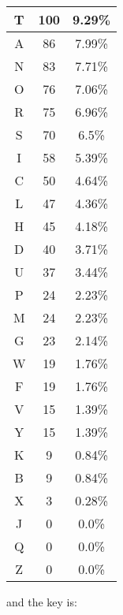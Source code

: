 \documentclass[12pt]{article}
\newcounter{index}
\newcommand{\increase}[1]{\ifthenelse{\arabic{#1}<26}{\addtocounter{#1}{1}}{\setcounter{#1}{1}}}
\newcommand{\pOneCipher}{CBDGFAIELKHJMSNQOPURVTYWXZ}
\newcommand{\pOneKey}{ETANORSICLHDUPMGWFVYKBXJQZ}
\newenvironment{answer}
{ \begin{tcolorbox}[halign=left]
    }
    {  
  \end{tcolorbox}
}
\begin{document}
\begin{enumerate}
\begin{enumerate}
\begin{answer}
\begin{center}
\begin{tabular}{c|c|c}
          \hline
          T & 100 & 9.29\% \\
          \hline
          A & 86 & 7.99\% \\
          \hline
          N & 83 & 7.71\% \\
          \hline
          O & 76 & 7.06\% \\
          \hline
          R & 75 & 6.96\% \\
          \hline
          S & 70 & 6.5\% \\
          \hline
          I & 58 & 5.39\% \\
          \hline
          C & 50 & 4.64\% \\
          \hline
          L & 47 & 4.36\% \\
          \hline
          H & 45 & 4.18\% \\
          \hline
          D & 40 & 3.71\% \\
          \hline
          U & 37 & 3.44\% \\
          \hline
          P & 24 & 2.23\% \\
          \hline
          M & 24 & 2.23\% \\
          \hline
          G & 23 & 2.14\% \\
          \hline
          W & 19 & 1.76\% \\
          \hline
          F & 19 & 1.76\% \\
          \hline
          V & 15 & 1.39\% \\
          \hline
          Y & 15 & 1.39\% \\
          \hline
          K & 9 & 0.84\% \\
          \hline
          B & 9 & 0.84\% \\
          \hline
          X & 3 & 0.28\% \\
          \hline
          J & 0 & 0.0\% \\
          \hline
          Q & 0 & 0.0\% \\
          \hline
          Z & 0 & 0.0\% \\
        \end{tabular}
      \end{center}
    \end{answer}
  \newpage
  \begin{answer}
    and the key is:
    \begin{center}
      \setcounter{index}{26}
    \end{center}
  \end{answer}


\end{enumerate}
\end{enumerate}
\end{document}
